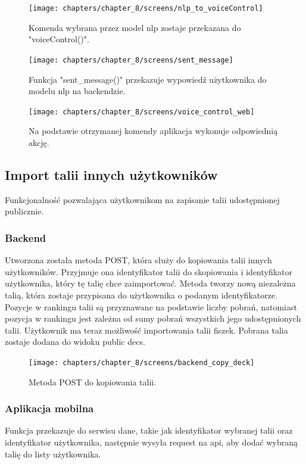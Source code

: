 \begin{figure}[H]
    \centering
    \texttt{[image: chapters/chapter\_8/screens/nlp\_to\_voiceControl]}
    \caption{Komenda wybrana przez model nlp zostaje przekazana do "voiceControl()".}
    \label{img:nlp_to_voiceControl}
\end{figure}

\begin{figure}[H]
    \centering
    \texttt{[image: chapters/chapter\_8/screens/sent\_message]}
    \caption{Funkcja "sent\_message()" przekazuje wypowiedź użytkownika do modelu nlp na backendzie.}
    \label{img:sent_message}
\end{figure}

\begin{figure}[H]
    \centering
    \texttt{[image: chapters/chapter\_8/screens/voice\_control\_web]}
    \caption{Na podstawie otrzymanej komendy aplikacja wykonuje odpowiednią akcję.}
    \label{img:voice_control_web}
\end{figure}

\subsection{Import talii innych użytkowników}
Funkcjonalność pozwalająca użytkownikom na zapisanie talii udostępnionej publicznie.

\subsubsection{Backend}
Utworzona została metoda POST, która służy do kopiowania talii innych użytkowników. Przyjmuje ona identyfikator talii do skopiowania i identyfikator użytkownika, który tę talię chce zaimportować. Metoda tworzy nową niezależna talią, która zostaje przypisana do użytkownika o podanym identyfikatorze. Pozycje w rankingu talii są przyznawane na podstawie liczby pobrań, natomiast pozycja w rankingu jest zależna od sumy pobrań wszystkich jego udostępnionych talii. Użytkownik ma teraz możliwość importowania talii fiszek. Pobrana talia zostaje dodana do widoku public decs.

\begin{figure}[H]
    \centering
    \texttt{[image: chapters/chapter\_8/screens/backend\_copy\_deck]}
    \caption{Metoda POST do kopiowania talii.}
    \label{img:backend_copy_deck}
\end{figure}

\subsubsection{Aplikacja mobilna}
Funkcja przekazuje do serwisu dane, takie jak identyfikator wybranej talii oraz identyfikator użytkownika, następnie wysyła request na api, aby dodać wybraną talię do listy użytkownika.

